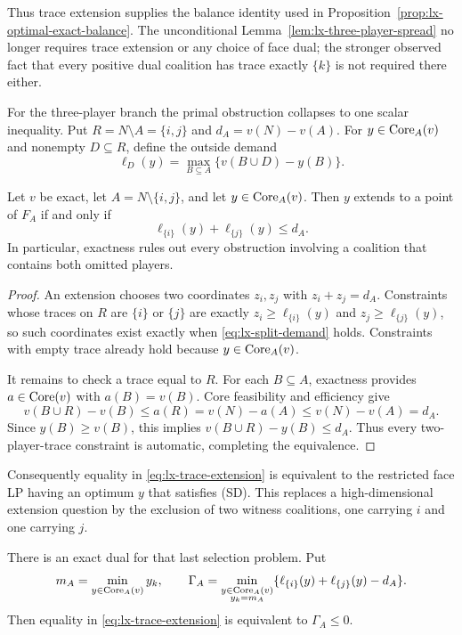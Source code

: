 Thus trace extension supplies the balance identity used in
Proposition~\ref{prop:lx-optimal-exact-balance}.  The unconditional
Lemma~\ref{lem:lx-three-player-spread} no longer requires trace extension or
any choice of face dual; the stronger observed fact that every positive dual
coalition has trace exactly $\{k\}$ is not required there either.

For the three-player branch the primal obstruction collapses to one scalar
inequality.  Put $R=N\setminus A=\{i,j\}$ and
$d_A=v(N)-v(A)$.  For $y\in\operatorname{Core}_A(v)$ and nonempty $D\subseteq R$, define
the outside demand
\[
 \ell_D(y)=\max_{B\subseteq A}\{v(B\cup D)-y(B)\}.
\]

\begin{proposition}
\label{prop:lx-two-player-trace}
Let $v$ be exact, let $A=N\setminus\{i,j\}$, and let
$y\in\operatorname{Core}_A(v)$.  Then $y$ extends to a point of $F_A$ if and only if
\[
 \ell_{\{i\}}(y)+\ell_{\{j\}}(y)\leq d_A.       \tag{SD}
 \label{eq:lx-split-demand}
\]
In particular, exactness rules out every obstruction involving a coalition
that contains both omitted players.
\end{proposition}

\begin{proof}
An extension chooses two coordinates $z_i,z_j$ with $z_i+z_j=d_A$.
Constraints whose traces on $R$ are $\{i\}$ or $\{j\}$ are exactly
$z_i\geq\ell_{\{i\}}(y)$ and $z_j\geq\ell_{\{j\}}(y)$, so such coordinates
exist exactly when \eqref{eq:lx-split-demand} holds.  Constraints with empty
trace already hold because $y\in\operatorname{Core}_A(v)$.

It remains to check a trace equal to $R$.  For each $B\subseteq A$, exactness
provides $a\in\operatorname{Core}(v)$ with $a(B)=v(B)$.  Core feasibility and efficiency
give
\[
 v(B\cup R)-v(B)\leq a(R)=v(N)-a(A)\leq v(N)-v(A)=d_A.
\]
Since $y(B)\geq v(B)$, this implies
$v(B\cup R)-y(B)\leq d_A$.  Thus every two-player-trace constraint is
automatic, completing the equivalence.
\end{proof}

Consequently equality in \eqref{eq:lx-trace-extension} is equivalent to the
restricted face LP having an optimum $y$ that satisfies (SD).  This replaces
a high-dimensional extension question by the exclusion of two witness
coalitions, one carrying $i$ and one carrying $j$.

There is an exact dual for that last selection problem.  Put
\[
 m_A=\min_{y\in\operatorname{Core}_A(v)}y_k,\qquad
 \Gamma_A=\min_{\substack{y\in\operatorname{Core}_A(v)\\y_k=m_A}}
 \{\ell_{\{i\}}(y)+\ell_{\{j\}}(y)-d_A\}.
\]
Then equality in \eqref{eq:lx-trace-extension} is equivalent to
$\Gamma_A\leq0$.

